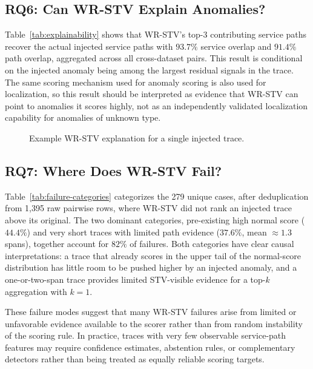 \subsection{RQ6: Can WR-STV Explain Anomalies?}
\label{sec:results-explainability}

Table~\ref{tab:explainability} shows that WR-STV's top-3 contributing
service paths recover the actual injected service paths with
\(93.7\%\) service overlap and \(91.4\%\) path overlap, aggregated across
all cross-dataset pairs. This result is conditional on the injected
anomaly being among the largest residual signals in the trace. The same
scoring mechanism used for anomaly scoring is also used for localization,
so this result should be interpreted as evidence that WR-STV can point to
anomalies it scores highly, not as an independently validated
localization capability for anomalies of unknown type.

\begin{figure}[t]
\centering
\caption{Example WR-STV explanation for a single injected trace.}
\label{fig:explanation-example}
\end{figure}

\subsection{RQ7: Where Does WR-STV Fail?}

Table~\ref{tab:failure-categories} categorizes the 279 unique cases,
after deduplication from 1{,}395 raw pairwise rows, where WR-STV did not
rank an injected trace above its original. The two dominant categories,
pre-existing high normal score (\(44.4\%\)) and very short traces with
limited path evidence (\(37.6\%\), mean \(\approx 1.3\) spans), together
account for \(82\%\) of failures. Both categories have clear causal
interpretations: a trace that already scores in the upper tail of the
normal-score distribution has little room to be pushed higher by an
injected anomaly, and a one-or-two-span trace provides limited
STV-visible evidence for a top-\(k\) aggregation with \(k=1\).

These failure modes suggest that many WR-STV failures arise from limited
or unfavorable evidence available to the scorer rather than from random
instability of the scoring rule. In practice, traces with very few
observable service-path features may require confidence estimates,
abstention rules, or complementary detectors rather than being treated
as equally reliable scoring targets.

